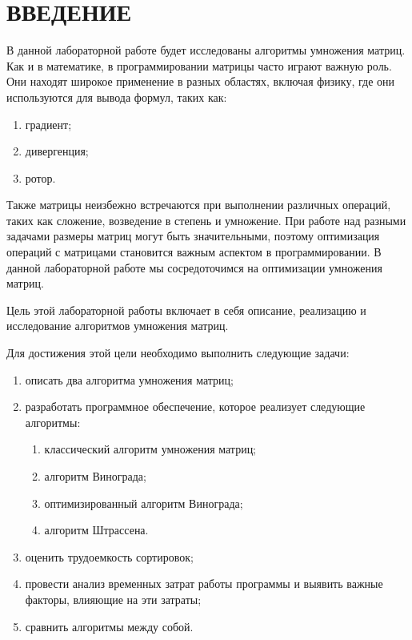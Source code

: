 \chapter*{ВВЕДЕНИЕ}


В данной лабораторной работе будет исследованы алгоритмы умножения матриц. Как и в математике, в программировании матрицы часто играют важную роль. Они находят широкое применение в разных областях, включая физику, где они используются для вывода формул, таких как:
\begin{enumerate}
	\item градиент;
	\item дивергенция;
	\item ротор. \cite{mat_usage}
\end{enumerate}

Также матрицы неизбежно встречаются при выполнении различных операций, таких как сложение, возведение в степень и умножение. При работе над разными задачами размеры матриц могут быть значительными, поэтому оптимизация операций с матрицами становится важным аспектом в программировании. В данной лабораторной работе мы сосредоточимся на оптимизации умножения матриц.

Цель этой лабораторной работы включает в себя описание, реализацию и исследование алгоритмов умножения матриц.

Для достижения этой цели необходимо выполнить следующие задачи:
\begin{enumerate}
	\item описать два алгоритма умножения матриц;
	\item разработать программное обеспечение, которое реализует следующие алгоритмы:
	\begin{enumerate}
		\item классический алгоритм умножения матриц;
		\item алгоритм Винограда;
		\item оптимизированный алгоритм Винограда;
		\item алгоритм Штрассена.
	\end{enumerate}
	\item оценить трудоемкость сортировок;
	\item провести анализ временных затрат работы программы и выявить важные факторы, влияющие на эти затраты;
	\item сравнить алгоритмы между собой.
\end{enumerate}

